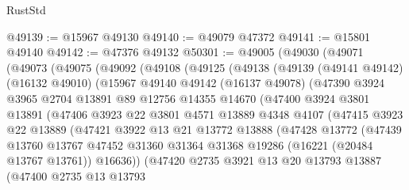 \begin{lexlean}{RustStd}
\begin{coremodule}
@49139 := @15967 @49130
@49140 := @49079 @47372
@49141 := @15801 @49140
@49142 := @47376 @49132
@50301 := @49005
    (@49030
      (@49071
        (@49073
          (@49075
            (@49092
              (@49108
                (@49125
                  (@49138
                    (@49139
                      (@49141 @49142)
                      (@16132 @49010)
                      (@15967
                        @49140
                        @49142
                        (@16137 @49078)
                        (@47390
                          @3924
                          @3965
                          @2704
                          @13891
                          @89
                          @12756
                          @14355
                          @14670
                          (@47400
                            @3924
                            @3801
                            @13891
                            (@47406
                              @3923
                              @22
                              @3801
                              @4571
                              @13889
                              @4348
                              @4107
                              (@47415
                                @3923
                                @22
                                @13889
                                (@47421
                                  @3922
                                  @13
                                  @21
                                  @13772
                                  @13888
                                  (@47428
                                    @13772
                                    (@47439
                                      @13760
                                      @13767
                                      @47452
                                      @31360
                                      @31364
                                      @31368
                                      @19286
                                      (@16221 (@20484 @13767 @13761))
                                      @16636))
                                  (@47420
                                    @2735
                                    @3921
                                    @13
                                    @20
                                    @13793
                                    @13887
                                    (@47400
                                      @2735
                                      @13
                                      @13793

\end{coremodule}
\end{lexlean}
